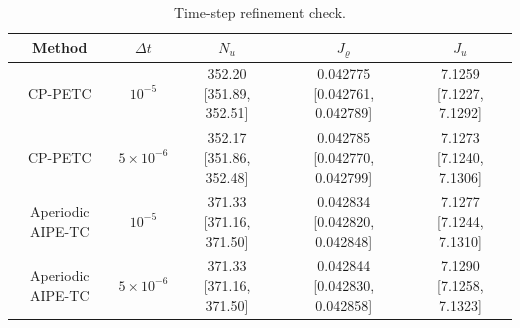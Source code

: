 \begin{table}[H]
\centering
\setlength{\tabcolsep}{3pt}
\caption{Time-step refinement check.}\label{tab:timestep_refinement}
\scriptsize
\begin{tabular}{ccccc}
\toprule
Method & $\Delta t$ & $N_u$ & $J_\varrho$ & $J_u$ \\
\midrule
CP-PETC & $10^{-5}$ & 352.20 [351.89, 352.51] & 0.042775 [0.042761, 0.042789] & 7.1259 [7.1227, 7.1292] \\
CP-PETC & $5\times10^{-6}$ & 352.17 [351.86, 352.48] & 0.042785 [0.042770, 0.042799] & 7.1273 [7.1240, 7.1306] \\
Aperiodic AIPE-TC & $10^{-5}$ & 371.33 [371.16, 371.50] & 0.042834 [0.042820, 0.042848] & 7.1277 [7.1244, 7.1310] \\
Aperiodic AIPE-TC & $5\times10^{-6}$ & 371.33 [371.16, 371.50] & 0.042844 [0.042830, 0.042858] & 7.1290 [7.1258, 7.1323] \\
\bottomrule
\end{tabular}
\end{table}
